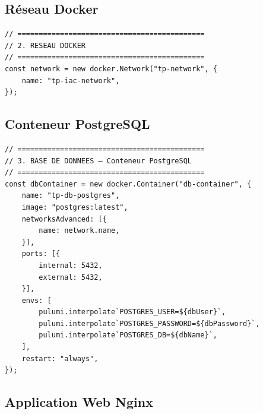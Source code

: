 \documentclass[12pt,a4paper]{article}
\begin{document}
\subsection{Réseau Docker}

\begin{lstlisting}[style=tsStyle, caption=Création du réseau partagé]
// ============================================
// 2. RESEAU DOCKER
// ============================================
const network = new docker.Network("tp-network", {
    name: "tp-iac-network",
});

\end{lstlisting}

\subsection{Conteneur PostgreSQL}

\begin{lstlisting}[style=tsStyle, caption=Déploiement de la base de données]
// ============================================
// 3. BASE DE DONNEES — Conteneur PostgreSQL
// ============================================
const dbContainer = new docker.Container("db-container", {
    name: "tp-db-postgres",
    image: "postgres:latest",
    networksAdvanced: [{
        name: network.name,
    }],
    ports: [{
        internal: 5432,
        external: 5432,
    }],
    envs: [
        pulumi.interpolate`POSTGRES_USER=${dbUser}`,
        pulumi.interpolate`POSTGRES_PASSWORD=${dbPassword}`,
        pulumi.interpolate`POSTGRES_DB=${dbName}`,
    ],
    restart: "always",
});

\end{lstlisting}

\subsection{Application Web Nginx}
\end{document}
